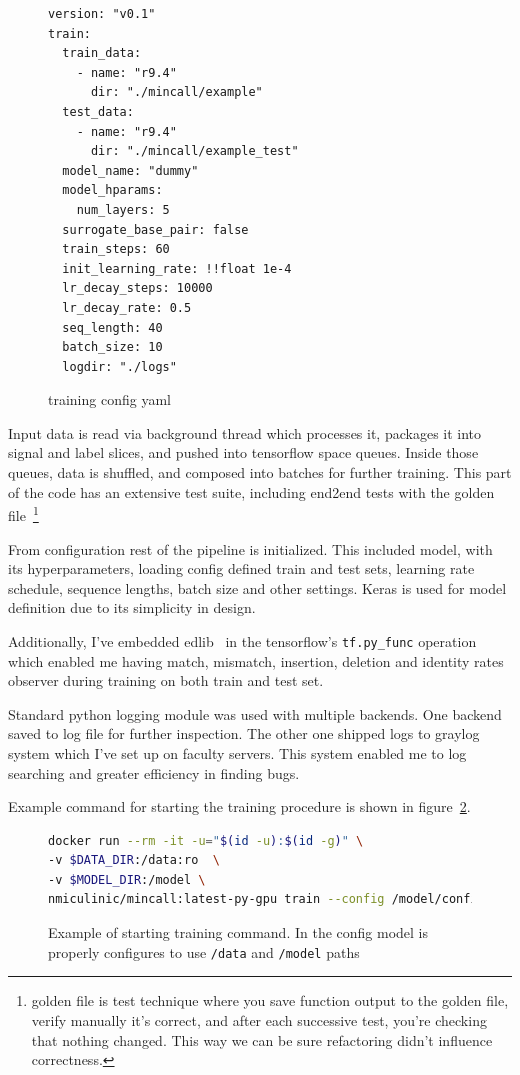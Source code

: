 \documentclass[times, utf8, diplomski, english]{fer}
\begin{document}
\begin{figure}
    \begin{center}
    \begin{lstlisting}[]
version: "v0.1"
train:
  train_data:
    - name: "r9.4"
      dir: "./mincall/example"
  test_data:
    - name: "r9.4"
      dir: "./mincall/example_test"
  model_name: "dummy"
  model_hparams:
    num_layers: 5
  surrogate_base_pair: false
  train_steps: 60
  init_learning_rate: !!float 1e-4
  lr_decay_steps: 10000
  lr_decay_rate: 0.5
  seq_length: 40
  batch_size: 10
  logdir: "./logs"
    \end{lstlisting}
    \caption{training config yaml}
    \label{fg:train_cfg_yml}
    \end{center}
\end{figure}

Input data is read via background thread which processes it, packages it into signal and label slices, and pushed into tensorflow space queues. Inside those queues, data is shuffled, and composed into batches for further training. This part of the code has an extensive test suite, including end2end tests with the golden file~\footnote{golden file is test technique where you save function output to the golden file, verify manually it's correct, and after each successive test, you're checking that nothing changed. This way we can be sure refactoring didn't influence correctness.}

From configuration rest of the pipeline is initialized. This included model, with its hyperparameters, loading config defined train and test sets, learning rate schedule, sequence lengths, batch size and other settings. Keras is used for model definition due to its simplicity in design. 

Additionally, I've embedded edlib~\citep{edlib} in the tensorflow's \texttt{tf.py\_func} operation which enabled me having match, mismatch, insertion, deletion and identity rates observer during training on both train and test set.

Standard python logging module was used with multiple backends. One backend saved to log file for further inspection. The other one shipped logs to graylog system which I've set up on faculty servers. This system enabled me to log searching and greater efficiency in finding bugs. 

Example command for starting the training procedure is shown in figure~\ref{fg:train_cfg_sh}.

\begin{figure}
    \begin{center}
    \begin{lstlisting}[language=bash,style=protobuf]
docker run --rm -it -u="$(id -u):$(id -g)" \
-v $DATA_DIR:/data:ro  \
-v $MODEL_DIR:/model \ 
nmiculinic/mincall:latest-py-gpu train --config /model/config.yml
    \end{lstlisting}
    \caption{Example of starting training command. In the config model is properly configures to use \texttt{/data} and \texttt{/model} paths}
    \label{fg:train_cfg_sh}
    \end{center}
\end{figure}
\end{document}
